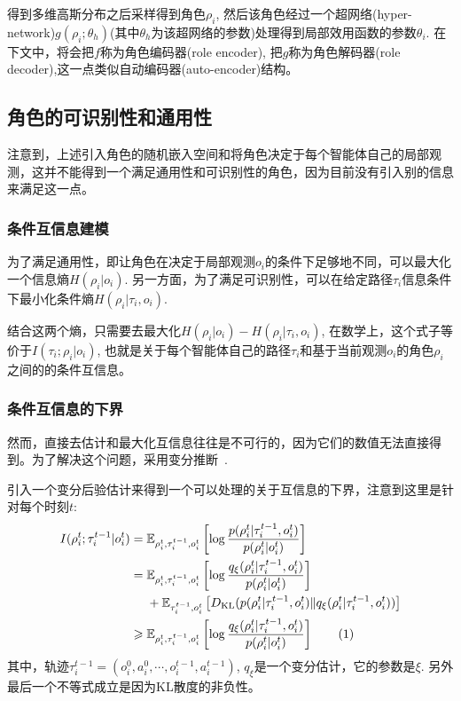 得到多维高斯分布之后采样得到角色$\rho_i$, 然后该角色经过一个超网络(hyper-network)$g(\rho_i;\theta_h)$(其中$\theta_h$为该超网络的参数)处理得到局部效用函数的参数$\theta_i$. 在下文中，将会把$f$称为角色编码器(role encoder), 把$g$称为角色解码器(role decoder),这一点类似自动编码器(auto-encoder)结构。

\subsection{角色的可识别性和通用性}
注意到，上述引入角色的随机嵌入空间和将角色决定于每个智能体自己的局部观测，这并不能得到一个满足通用性和可识别性的角色，因为目前没有引入别的信息来满足这一点。

\subsubsection{条件互信息建模}
为了满足通用性，即让角色在决定于局部观测$o_i$的条件下足够地不同，可以最大化一个信息熵$H(\rho_i|o_i)$. 另一方面，为了满足可识别性，可以在给定路径$\tau_i$信息条件下最小化条件熵$H(\rho_i | \tau_i, o_i)$.

结合这两个熵，只需要去最大化$H(\rho_i | o_i) - H(\rho_i | \tau_i, o_i)$, 在数学上，这个式子等价于$I(\tau_i; \rho_i | o_i)$, 也就是关于每个智能体自己的路径$\tau_i$和基于当前观测$o_i$的角色$\rho_i$之间的的条件互信息。

\subsubsection{条件互信息的下界}
然而，直接去估计和最大化互信息往往是不可行的，因为它们的数值无法直接得到。为了解决这个问题，采用变分推断~\cite{wainwright2008graphical, alemi2017deep}.

引入一个变分后验估计来得到一个可以处理的关于互信息的下界，注意到这里是针对每个时刻$t$:
\begin{align*}
    I(\rho^t_i; \tau^{t-1}_i | o^t_i) & = \mathbb{E}_{\rho^t_i, \tau^{t-1}_i, o^t_i}\left[\log\frac{p(\rho^t_i | \tau^{t-1}_i, o^t_i)}{p(\rho^t_i | o^t_i)}\right] \\
    & = \mathbb{E}_{\rho^t_i, \tau^{t-1}_i, o^t_i}\left[\log\frac{q_\xi(\rho^t_i | \tau^{t-1}_i, o^t_i)}{p(\rho^t_i | o^t_i)}\right] \\ & \ \ \ \ + \mathbb{E}_{\tau^{t-1}_i, o^t_i}\left[\KL(p(\rho^t_i|\tau^{t-1}_i, o^t_i) \| q_\xi(\rho^t_i|\tau^{t-1}_i, o^t_i))\right] \\
    & \ge  \mathbb{E}_{\rho^t_i, \tau^{t-1}_i, o^t_i}\left[\log\frac{q_\xi(\rho^t_i | \tau^{t-1}_i, o^t_i)}{p(\rho^t_i | o^t_i)}\right]\stepcounter{equation}\tag{\theequation}
    \label{equ:mi}
 \end{align*}
其中，轨迹$\tau^{t-1}_i=(o_i^0, a_i^0, \cdots, o_i^{t-1}, a_i^{t-1})$, $q_\xi$是一个变分估计，它的参数是$\xi$. 另外最后一个不等式成立是因为KL散度的非负性。

